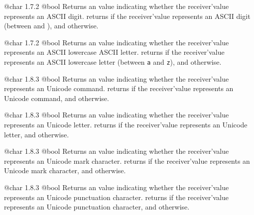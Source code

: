 {@char}
{1.7.2}
{@bool}
{Returns an  value indicating whether the receiver'value represents an ASCII digit.}
{returns  if the receiver'value represents an ASCII digit (between \texttt{\textquotesingle} and \texttt{\textquotesingle}), and  otherwise.}





{@char}
{1.7.2}
{@bool}
{Returns an  value indicating whether the receiver'value represents an ASCII lowercase ASCII letter.}
{returns  if the receiver'value represents an ASCII lowercase letter (between \texttt{\textquotesingle a\textquotesingle} and \texttt{\textquotesingle z\textquotesingle}), and  otherwise.}






{@char}
{1.8.3}
{@bool}
{Returns an  value indicating whether the receiver'value represents an Unicode command.}
{returns  if the receiver'value represents an Unicode command, and  otherwise.}






{@char}
{1.8.3}
{@bool}
{Returns an  value indicating whether the receiver'value represents an Unicode letter.}
{returns  if the receiver'value represents an Unicode letter, and  otherwise.}






{@char}
{1.8.3}
{@bool}
{Returns an  value indicating whether the receiver'value represents an Unicode mark character.}
{returns  if the receiver'value represents an Unicode mark character, and  otherwise.}






{@char}
{1.8.3}
{@bool}
{Returns an  value indicating whether the receiver'value represents an Unicode punctuation character.}
{returns  if the receiver'value represents an Unicode punctuation character, and  otherwise.}






